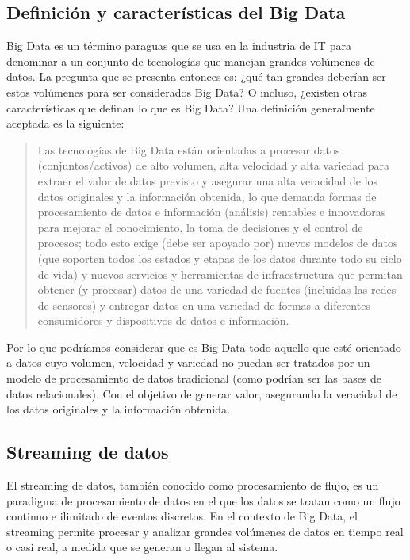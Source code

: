 \subsection{Definición y características del Big Data}

Big Data es un término paraguas que se usa en la industria de IT para denominar a un conjunto de tecnologías que manejan grandes volúmenes de datos.
La pregunta que se presenta entonces es: ¿qué tan grandes deberían ser estos volúmenes para ser considerados Big Data?
O incluso, ¿existen otras características que definan lo que es Big Data?
Una definición generalmente aceptada es la siguiente:

\begin{quote}
Las tecnologías de Big Data están orientadas a
procesar datos (conjuntos/activos) de alto volumen, alta velocidad y alta variedad
para extraer el valor de datos previsto y asegurar una alta
veracidad de los datos originales y la información obtenida, lo que demanda
formas de procesamiento de datos e información (análisis) rentables e innovadoras
para mejorar el conocimiento, la toma de decisiones y el control de procesos;
todo esto exige (debe ser apoyado por) nuevos modelos de datos
(que soporten todos los estados y etapas de los datos durante todo su ciclo de vida)
y nuevos servicios y herramientas de infraestructura que permitan obtener (y procesar)
datos de una variedad de fuentes (incluidas las redes de sensores) y
entregar datos en una variedad de formas a diferentes consumidores y dispositivos
de datos e información. \parencite{demchenko2014addressing}
\end{quote}

\newpage
Por lo que podríamos considerar que es Big Data todo aquello que esté orientado a datos
cuyo volumen, velocidad y variedad no puedan ser tratados por un modelo de procesamiento
de datos tradicional (como podrían ser las bases de datos relacionales). Con el objetivo
de generar valor, asegurando la veracidad de los datos originales y la información obtenida.

\subsection{Streaming de datos}

El streaming de datos, también conocido como procesamiento de flujo, es un paradigma 
de procesamiento de datos en el que los datos se tratan como un flujo continuo e 
ilimitado de eventos discretos. En el contexto de Big Data, el streaming permite procesar 
y analizar grandes volúmenes de datos en tiempo real o casi real, a medida que se generan 
o llegan al sistema. \parencite{flink}

